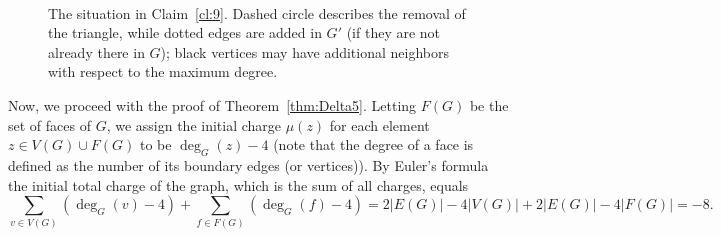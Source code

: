 \documentclass[10pt,a4paper]{article}
\begin{document}
\begin{figure}[ht!]
\begin{center}
 \\
	\caption{The situation in Claim~\ref{cl:9}. Dashed circle describes the removal of the triangle, while dotted edges are added in $G'$ (if they are not already there in $G$); black vertices may have additional neighbors with respect to the maximum degree.}\label{fig:cl:9}
\end{center}
\end{figure}





Now, we proceed with the proof of Theorem~\ref{thm:Delta5}. Letting $F(G)$ be the set of faces of $G$, we assign the initial charge $\mu(z)$ for each element $z\in V(G)\cup F(G)$ to be $\deg_G(z)-4$ (note that the degree of a face is defined as the number of its boundary edges (or vertices)). By Euler's formula the initial total charge of the graph, which is the sum of all charges, equals
$$\sum_{v\in V(G)}{(\deg_G(v)-4)}+\sum_{f\in F(G)}{(\deg_G(f)-4)}=2|E(G)|-4|V(G)|+2|E(G)|-4|F(G)|=-8.$$
\end{document}
